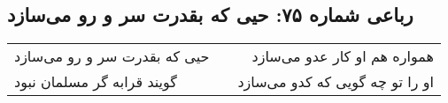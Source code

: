 \begin{center}
\section*{رباعی شماره ۷۵: حیی که بقدرت سر و رو می‌سازد}
\label{sec:sh075}
\begin{longtable}{l p{0.5cm} r}
حیی که بقدرت سر و رو می‌سازد
&&
همواره هم او کار عدو می‌سازد
\\
گویند قرابه گر مسلمان نبود
&&
او را تو چه گویی که کدو می‌سازد
\\
\end{longtable}
\end{center}
